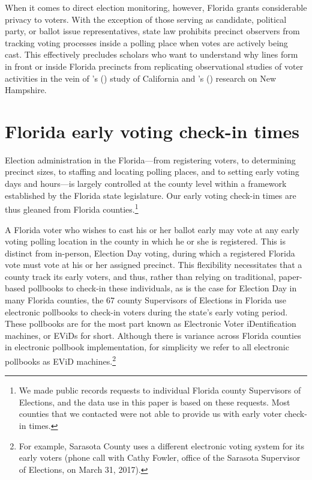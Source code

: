 \documentclass[12pt,titlepage]{article}
\newcommand{\possessivecite}[1]{\citeauthor{#1}'s (\citeyear{#1})}
\begin{document}
When it comes to direct election monitoring, however, Florida grants
considerable privacy to voters.  With the exception of those serving
as candidate, political party, or ballot issue representatives, state
law prohibits precinct observers from tracking voting processes inside
a polling place when votes are actively being cast. This effectively
precludes scholars who want to understand why lines form in front or
inside Florida precincts from replicating observational studies of
voter activities in the vein of
\possessivecite{spencermarkovits:renege} study of California and
\possessivecite{herronsmith:hanoverstudy} research on New Hampshire.

\section*{Florida early voting check-in times}

Election administration in the Florida---from registering voters, to
determining precinct sizes, to staffing and locating polling places,
and to setting early voting days and hours---is largely controlled at
the county level within a framework established by the Florida state
legislature. Our early voting check-in times are thus gleaned from
Florida counties.\footnote{We made public records requests to
  individual Florida county Supervisors of Elections, and the data use
  in this paper is based on these requests.  Most counties that we
  contacted were not able to provide us with early voter check-in
  times.}


A Florida voter who wishes to cast his or her ballot early may vote at
any early voting polling location in the county in which he or she is
registered.  This is distinct from in-person, Election Day voting,
during which a registered Florida vote must vote at his or her
assigned precinct.  This flexibility necessitates that a county track
its early voters, and thus, rather than relying on traditional,
paper-based pollbooks to check-in these individuals, as is the case
for Election Day in many Florida counties, the 67 county Supervisors
of Elections in Florida use electronic pollbooks to check-in voters
during the state's early voting period.  These pollbooks are for the
most part known as Electronic Voter iDentification machines, or EViDs
for short.  Although there is variance across Florida counties in
electronic pollbook implementation, for simplicity we refer to all
electronic pollbooks as EViD machines.\footnote{For example, Sarasota
  County uses a different electronic voting system for its early
  voters (phone call with Cathy Fowler, office of the Sarasota
  Supervisor of Elections, on March 31, 2017).}
\end{document}
